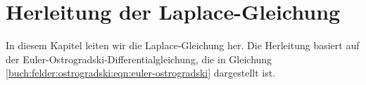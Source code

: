 %
%
%


\section{Herleitung der Laplace-Gleichung}
In diesem Kapitel leiten wir die Laplace-Gleichung her. Die Herleitung basiert auf der Euler-Ostrogradski-Differentialgleichung, die in Gleichung \eqref{buch:felder:ostrogradski:eqn:euler-ostrogradski} dargestellt ist.

